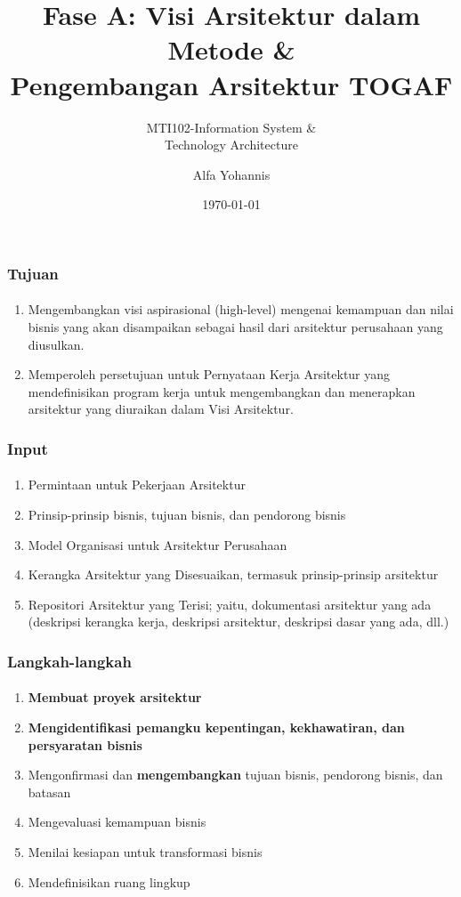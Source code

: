 \documentclass[aspectratio=169, table]{beamer}
\subtitle{MTI102-Information System \&\\Technology Architecture}
\title{Fase A: Visi Arsitektur dalam Metode \&\\ Pengembangan Arsitektur TOGAF}
\author{Alfa Yohannis}
\date{\today}
\begin{document}
	
	\frame{\titlepage}
	
	\begin{frame}
		\frametitle{Tujuan}
		\framesubtitle{\hspace{1cm}}
		\begin{enumerate}			
			\item Mengembangkan visi aspirasional (high-level) mengenai kemampuan dan nilai bisnis yang akan disampaikan sebagai hasil dari arsitektur perusahaan yang diusulkan.
			\item Memperoleh persetujuan untuk Pernyataan Kerja Arsitektur yang mendefinisikan program kerja untuk mengembangkan dan menerapkan arsitektur yang diuraikan dalam Visi Arsitektur.
		\end{enumerate}
	\end{frame}
	
	\begin{frame}
		\frametitle{Input}
		\framesubtitle{\hspace{1cm}}
		\begin{enumerate}
			\item Permintaan untuk Pekerjaan Arsitektur
			\item Prinsip-prinsip bisnis, tujuan bisnis, dan pendorong bisnis
			\item Model Organisasi untuk Arsitektur Perusahaan
			\item Kerangka Arsitektur yang Disesuaikan, termasuk prinsip-prinsip arsitektur
			\item Repositori Arsitektur yang Terisi; yaitu, dokumentasi arsitektur yang ada (deskripsi kerangka kerja, deskripsi arsitektur, deskripsi dasar yang ada, dll.)
		\end{enumerate}
	\end{frame}
	
	\begin{frame}
		\frametitle{Langkah-langkah}
		\framesubtitle{\hspace{1cm}}
		\begin{enumerate}
			
			\item \textbf{Membuat proyek arsitektur}
			\item \textbf{Mengidentifikasi pemangku kepentingan, kekhawatiran, dan persyaratan bisnis}
			\item Mengonfirmasi dan \textbf{mengembangkan} tujuan bisnis, pendorong bisnis, dan batasan
			\item Mengevaluasi kemampuan bisnis
			\item Menilai kesiapan untuk transformasi bisnis
			\item Mendefinisikan ruang lingkup
			
		\end{enumerate}
	\end{frame}
	
\end{document}
